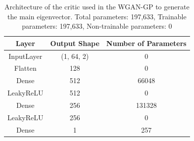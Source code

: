 \documentclass[11pt,a4paper,twoside]{report}
\begin{document}
\begin{table}[]
  \centering
  \begin{tabular}{c c c}
      \hline
      \textbf{Layer} & \textbf{Output Shape} & \textbf{Number of Parameters} \\ \hline
      InputLayer            & (1, 64, 2)    & 0                 \\
      Flatten               & 128           & 0                 \\
      Dense                 & 512           & 66048             \\
      LeakyReLU             & 512           & 0                 \\
      Dense                 & 256           & 131328            \\
      LeakyReLU             & 256           & 0                 \\
      Dense                 & 1             & 257               \\
  \end{tabular}
  \caption{Architecture of the critic used in the WGAN-GP to generate the main eigenvector. Total parameters: 197,633, Trainable parameters: 197,633, Non-trainable parameters: 0}
  \label{tab:main_evec_critic_WGANGP_architecture}
\end{table}


\cleardoublepage

\fancyhead[LO]{\scshape\bibname}
\fancyhead[RO]{}
\fancyhead[LE]{}
\fancyhead[RE]{\scshape\bibname}



\cleardoublepage

\fancyhead[LO]{\scshape \listfigurename}
\fancyhead[RO]{}
\fancyhead[LE]{}
\fancyhead[RE]{\scshape \listfigurename}
\listoffigures

\cleardoublepage

\fancyhead[LO]{\scshape \listtablename}
\fancyhead[RO]{}
\fancyhead[LE]{}
\fancyhead[RE]{\scshape \listtablename}
\listoftables

\cleardoublepage
\fancyhead[LO]{}
\fancyhead[RO]{}
\fancyhead[LE]{}
\fancyhead[RE]{}



\end{document}
